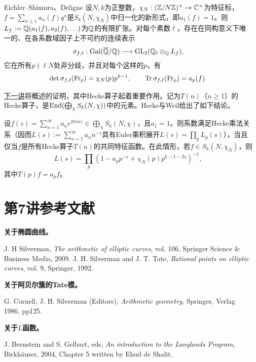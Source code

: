 \begin{theorem}{Eichler--Shimura、Deligne}\label{L7S2O10}
设$N,k$为正整数，$\chi_N:(\mathbb{Z}/N\mathbb{Z})^\times\to\mathbb{C}^\times$为特征标，$f=\sum_{n\geq1}a_n(f)q^n$是$S_k(N,\chi_N)$中归一化的新形式，即$a_1(f)=1$。则$L_f:=\mathbb{Q}(a_1(f),a_2(f),\ldots)$为$\mathbb{Q}$的有限扩张。对每个素数$\ell$，存在在同构意义下唯一的、在各系数域因子上不可约的连续表示
\[\sigma_{f,\ell}:\operatorname{Gal}(\overline{\mathbb{Q}}/\mathbb{Q})\longrightarrow\operatorname{GL}_2(\mathbb{Q}_\ell\otimes_{\mathbb{Q}} L_f),\]
它在所有$p\nmid\ell N$处非分歧，并且对每个这样的$p$，有
\[\det\sigma_{f,\ell}(\mathrm{Fr}_p)=\chi_N(p)p^{k-1},\qquad \operatorname{Tr}\sigma_{f,\ell}(\mathrm{Fr}_p)=a_p(f).\]
\end{theorem}
\hyperref[L8]{下一讲}将概述的证明，其中Hecke算子起着重要作用。记为$T(n)$（$n\geq1$）的Hecke算子，是$\operatorname{End}(\bigoplus_\chi S_k(N,\chi))$中的元素。Hecke与Weil给出了如下结论。
\begin{theorem}\label{L7S2O11}
设$f(z)=\sum_{n=1}^\infty a_ne^{2\pi inz}\in\bigoplus_\chi S_k(N,\chi)$，且$a_1=1$。则系数满足Hecke乘法关系（因而$L(s):=\sum_{n=1}^\infty a_nn^{-s}$具有Euler乘积展开$L(s)=\prod_pL_p(s)$），当且仅当$f$是所有Hecke算子$T(n)$的共同特征函数。在此情形，若$f\in S_k(N,\chi_N)$，则
\[L(s)=\prod_p(1-a_pp^{-s}+\chi_N(p)p^{k-1-2s})^{-1},\]
其中$T(p)f=a_pf$。
\end{theorem}
\section{第7讲参考文献}\label{L7S3}
\textbf{关于椭圆曲线。}
\begin{references}
 J. H Silverman, \emph{The arithmetic of elliptic curves}, vol. 106, Springer Science \& Business Media, 2009.
 J. H. Silverman and J. T. Tate, \emph{Rational points on elliptic curves}, vol. 9, Springer, 1992.
\end{references}
\textbf{关于阿贝尔簇的Tate模。}
\begin{references}
 G. Cornell, J. H. Silverman (Editors), \emph{Arithmetic geometry}, Springer, Verlag 1986, pp125.
\end{references}
\textbf{关于$L$函数。}
\begin{references}
 J. Bernstein and S. Gelbart, eds, \emph{An introduction to the Langlands Program}, Birkhäuser, 2004, Chapter 5 written by Ehud de Shalit.
\end{references}
